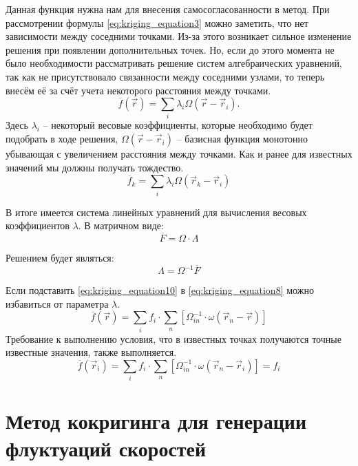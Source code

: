 Данная функция нужна нам для внесения самосогласованности в метод. При рассмотрении формулы \eqref{eq:kriging_equation3} можно заметить, что нет зависимости между соседними точками. Из-за этого возникает сильное изменение решения при появлении дополнительных точек. Но, если до этого момента не было необходимости рассматривать решение систем алгебраических уравнений, так как не присутствовало связанности между соседними узлами, то теперь внесём её за счёт учета некоторого расстояния между точками.
\begin{equation}
  \label{eq:kriging_equation7}
  \overline{f}(\vec r) = \sum_i \lambda_i \Omega(\vec r - \vec r_i).
\end{equation}
Здесь $\lambda_i$ -- некоторый весовые коэффициенты, которые необходимо будет подобрать в ходе решения, $\Omega(\vec r - \vec r_i)$ -- базисная функция монотонно убывающая с увеличением расстояния между точками. Как и ранее для известных значений мы должны получать тождество.
\begin{equation}
  \label{eq:kriging_equation8}
  \overline{f}_k = \sum_i \lambda_i \Omega(\vec r_k - \vec r_i)
\end{equation}

В итоге имеется система линейных уравнений для вычисления весовых коэффициентов $\lambda$. В матричном виде:
\begin{equation}
  \label{eq:kriging_equation9}
  \overline{F} = \Omega \cdot \Lambda 
\end{equation}

Решением будет являться:
\begin{equation}
  \label{eq:kriging_equation10}
  \Lambda = \Omega^{-1} \overline{F}
\end{equation}

Если подставить \eqref{eq:kriging_equation10} в \eqref{eq:kriging_equation8} можно избавиться от параметра $\lambda$.
\begin{equation}
  \overline{f}(\vec r) = \sum_i f_i \cdot \sum_n \left[ \Omega^{-1}_{in} \cdot \omega(\vec r_n - \vec r) \right] 
\end{equation}
Требование к выполнению условия, что в известных точках получаются точные известные значения, также выполняется. 
\begin{equation}
  \overline{f}(\vec r_i) = \sum_i f_i \cdot \sum_n \left[ \Omega^{-1}_{in} \cdot \omega(\vec r_n - \vec r_i) \right] = f_i 
\end{equation}


\section{Метод кокригинга для генерации флуктуаций скоростей} \label{sect1_3}

